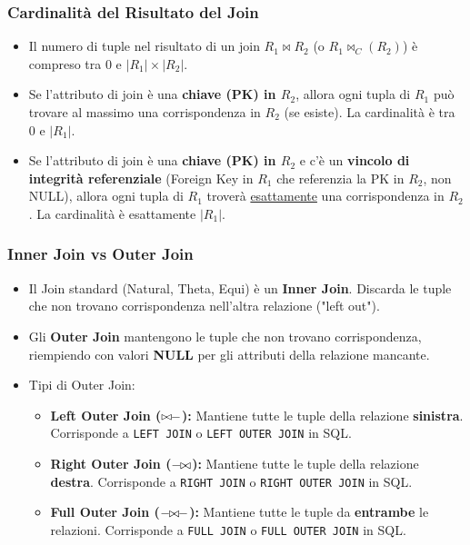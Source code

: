 \documentclass{article}
\newcommand{\naturaljoin}{\Join}
\newcommand{\thetajoin}[2]{\Join_{#1}(#2)}
\DeclareRobustCommand{\lj}{\text{\ensuremath{\bowtie \mkern -1.5mu \relbar}}}
\DeclareRobustCommand{\rj}{\text{\ensuremath{\relbar \mkern -1.5mu \bowtie}}}
\DeclareRobustCommand{\fj}{\text{\ensuremath{\relbar \mkern -1.5mu \bowtie \mkern -1.5mu \relbar}}}
\newcommand{\leftouterjoin}{\lj}
\newcommand{\rightouterjoin}{\rj}
\newcommand{\fullouterjoin}{\fj}
\begin{document}
	\subsubsection{Cardinalità del Risultato del Join}
	\begin{itemize}
		\item Il numero di tuple nel risultato di un join $R_1 \naturaljoin R_2$ (o $R_1 \thetajoin{C}{R_2}$) è compreso tra 0 e $|R_1| \times |R_2|$.
		\item Se l'attributo di join è una \textbf{chiave (PK) in $R_2$}, allora ogni tupla di $R_1$ può trovare al massimo una corrispondenza in $R_2$ (se esiste). La cardinalità è tra 0 e $|R_1|$.
		\item Se l'attributo di join è una \textbf{chiave (PK) in $R_2$} e c'è un \textbf{vincolo di integrità referenziale} (Foreign Key in $R_1$ che referenzia la PK in $R_2$, non NULL), allora ogni tupla di $R_1$ troverà \underline{esattamente} una corrispondenza in $R_2$. La cardinalità è esattamente $|R_1|$.
	\end{itemize}
	
	\subsubsection{Inner Join vs Outer Join}
	\begin{itemize}
		\item Il Join standard (Natural, Theta, Equi) è un \textbf{Inner Join}. Discarda le tuple che non trovano corrispondenza nell'altra relazione ("left out").
		\item Gli \textbf{Outer Join} mantengono le tuple che non trovano corrispondenza, riempiendo con valori \textbf{NULL} per gli attributi della relazione mancante.
		\item Tipi di Outer Join:
		\begin{itemize}
			\item \textbf{Left Outer Join ($\leftouterjoin$):} Mantiene tutte le tuple della relazione \textbf{sinistra}. Corrisponde a \texttt{LEFT JOIN} o \texttt{LEFT OUTER JOIN} in SQL.
			\item \textbf{Right Outer Join ($\rightouterjoin$):} Mantiene tutte le tuple della relazione \textbf{destra}. Corrisponde a \texttt{RIGHT JOIN} o \texttt{RIGHT OUTER JOIN} in SQL.
			\item \textbf{Full Outer Join ($\fullouterjoin$):} Mantiene tutte le tuple da \textbf{entrambe} le relazioni. Corrisponde a \texttt{FULL JOIN} o \texttt{FULL OUTER JOIN} in SQL.
		\end{itemize}
	\end{itemize}
	
\end{document}
